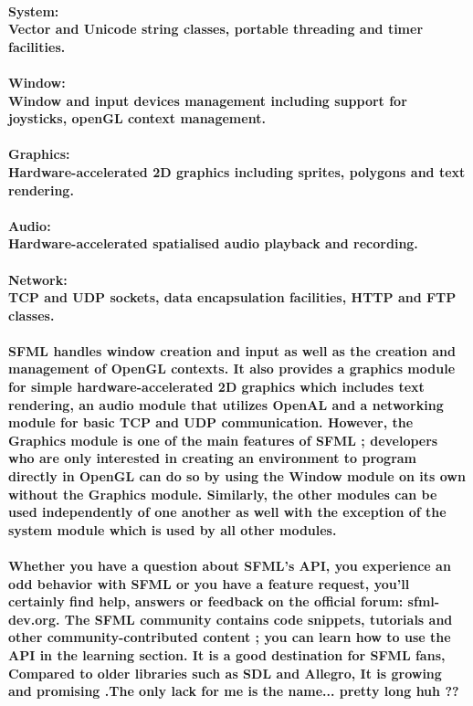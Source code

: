 \paragraph*{System:\\
Vector and Unicode string classes, portable threading and timer facilities.}
\paragraph*{Window:\\
Window and input devices management including support for joysticks, openGL context management.}
\paragraph*{Graphics:\\
Hardware-accelerated 2D graphics including sprites, polygons and text rendering.}
\paragraph*{Audio:\\
Hardware-accelerated spatialised audio playback and recording.}
\paragraph*{Network:\\
TCP and UDP sockets, data encapsulation facilities, HTTP and FTP classes.}
\paragraph*{SFML handles window creation and input as well as the creation and management of OpenGL contexts. It also provides a graphics module for simple hardware-accelerated 2D graphics which includes text rendering, an audio module that utilizes OpenAL and a networking module for basic TCP and UDP communication. However, the Graphics module is one of the main features of SFML ; developers who are only interested in creating an environment to program directly in OpenGL can do so by using the Window module on its own without the Graphics module. Similarly, the other modules can be used independently of one another as well with the exception of the system module which is used by all other modules.}
\paragraph*{Whether you have a question about SFML's API, you experience an odd behavior with SFML or you have a 
feature request, you'll certainly find help, answers or feedback on the official forum: sfml-dev.org. The SFML community contains code snippets, tutorials and other community-contributed content ; you can learn how to use the API in the learning section. It is a good destination for SFML fans, Compared to older libraries such as SDL and Allegro, It is growing and promising .The only lack for me is the name... pretty long huh ??}